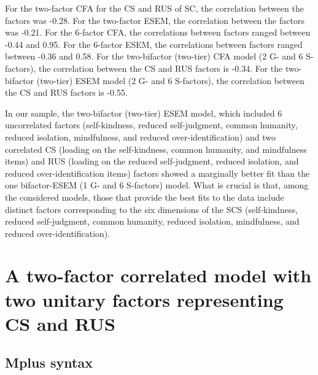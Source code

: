 \documentclass[aps,floatfix,prl]{revtex4}
\begin{document}
For the two-factor CFA for the CS and RUS of SC, the correlation between
the factors was -0.28. For the two-factor ESEM, the correlation between
the factors was -0.21. For the 6-factor CFA, the correlations between
factors ranged between -0.44 and 0.95. For the 6-factor ESEM, the
correlations between factors ranged between -0.36 and 0.58. For the
two-bifactor (two-tier) CFA model (2 G- and 6 S-factors), the
correlation between the CS and RUS factors is -0.34. For the
two-bifactor (two-tier) ESEM model (2 G- and 6 S-factors), the
correlation between the CS and RUS factors is -0.55.

In our sample, the two-bifactor (two-tier) ESEM model, which included 6
uncorrelated factors (self-kindness, reduced self-judgment, common
humanity, reduced isolation, mindfulness, and reduced
over-identification) and two correlated CS (loading on the
self-kindness, common humanity, and mindfulness items) and RUS (loading
on the reduced self-judgment, reduced isolation, and reduced
over-identification items) factors showed a marginally better fit than
the one bifactor-ESEM (1 G- and 6 S-factors) model. What is crucial is
that, among the considered models, those that provide the best fits to
the data include distinct factors corresponding to the six dimensions of
the SCS (self-kindness, reduced self-judgment, common humanity, reduced
isolation, mindfulness, and reduced over-identification).

\newpage


\section{A two-factor correlated model with two unitary factors
representing CS and
RUS}\label{a-two-factor-correlated-model-with-two-unitary-factors-representing-cs-and-rus}

\subsection{Mplus syntax}\label{mplus-syntax}
\end{document}
